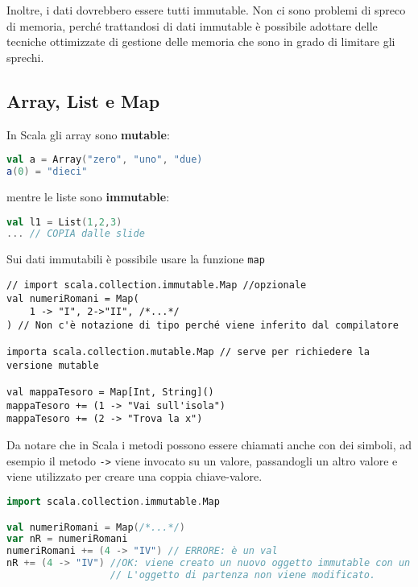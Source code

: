 Inoltre, i dati dovrebbero essere tutti immutable. Non ci sono problemi di spreco di memoria, perché trattandosi di dati immutable è possibile adottare delle tecniche ottimizzate di gestione delle memoria che sono in grado di limitare gli sprechi.

\subsection{Array, List e Map}

In Scala gli array sono \textbf{mutable}:

\begin{lstlisting}[language=Scala]
val a = Array("zero", "uno", "due)
a(0) = "dieci"
\end{lstlisting}

mentre le liste sono \textbf{immutable}:

\begin{lstlisting}[language=Scala]
val l1 = List(1,2,3)
... // COPIA dalle slide
\end{lstlisting}

Sui dati immutabili è possibile usare la funzione \texttt{map}

\begin{lstlisting}
// import scala.collection.immutable.Map //opzionale
val numeriRomani = Map(
	1 -> "I", 2->"II", /*...*/
) // Non c'è notazione di tipo perché viene inferito dal compilatore

importa scala.collection.mutable.Map // serve per richiedere la versione mutable

val mappaTesoro = Map[Int, String]()
mappaTesoro += (1 -> "Vai sull'isola")
mappaTesoro += (2 -> "Trova la x")
\end{lstlisting}

Da notare che in Scala i metodi possono essere chiamati anche con dei simboli, ad esempio il metodo \texttt{->} viene invocato su un valore, passandogli un altro valore e viene utilizzato per creare una coppia chiave-valore.

\begin{lstlisting}[language=Scala]
import scala.collection.immutable.Map

val numeriRomani = Map(/*...*/)
var nR = numeriRomani
numeriRomani += (4 -> "IV") // ERRORE: è un val
nR += (4 -> "IV") //OK: viene creato un nuovo oggetto immutable con un valore extra. 
                  // L'oggetto di partenza non viene modificato.
\end{lstlisting}


